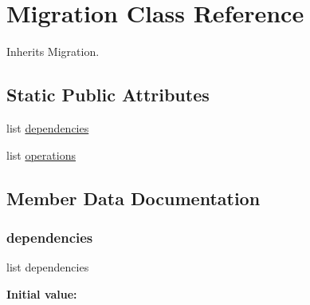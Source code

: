 \hypertarget{classjoinapp_1_1migrations_1_10003__auto__20190605__1445_1_1_migration}{}\section{Migration Class Reference}
\label{classjoinapp_1_1migrations_1_10003__auto__20190605__1445_1_1_migration}


Inherits Migration.

\subsection*{Static Public Attributes}
\begin{DoxyCompactItemize}
\item 
list \mbox{\hyperlink{classjoinapp_1_1migrations_1_10003__auto__20190605__1445_1_1_migration_a2bf1a0da0a83299e260789a8473d7460}{dependencies}}
\item 
list \mbox{\hyperlink{classjoinapp_1_1migrations_1_10003__auto__20190605__1445_1_1_migration_a33f24b85692683d7286389f0224a3d13}{operations}}
\end{DoxyCompactItemize}


\subsection{Member Data Documentation}
\mbox{\label{classjoinapp_1_1migrations_1_10003__auto__20190605__1445_1_1_migration_a2bf1a0da0a83299e260789a8473d7460}} 
\subsubsection{\texorpdfstring{dependencies}{dependencies}}
{\footnotesize\ttfamily list dependencies\hspace{0.3cm}{\ttfamily [static]}}

{\bfseries Initial value\+:}
\begin{DoxyCode}{0}
\DoxyCodeLine{=  [}
\DoxyCodeLine{        (\textcolor{stringliteral}{'joinapp'}, \textcolor{stringliteral}{'0002\_auto\_20190605\_1443'}),}
\DoxyCodeLine{    ]}

\end{DoxyCode}
\mbox{\label{classjoinapp_1_1migrations_1_10003__auto__20190605__1445_1_1_migration_a33f24b85692683d7286389f0224a3d13}} 
